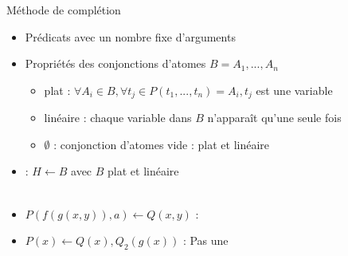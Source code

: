 \begin{frame}{Méthode de complétion}
  \begin{center}
  \end{center}
\end{frame}

\begin{frame}{\csclause}
  \begin{itemize}[<+->]
  \item Prédicats avec un nombre fixe d'arguments
  \item Propriétés des conjonctions d'atomes $B = A_1, ..., A_n$
    \begin{itemize}
    \item plat : $\forall A_i \in B, \forall t_j \in P(t_1, ..., t_n) = A_i, t_j$ est une variable
    \item linéaire : chaque variable dans $B$ n'apparaît qu'une seule fois
    \item $\emptyset$ : conjonction d'atomes vide : plat et linéaire
    \end{itemize}
    \vspace{\baselineskip}
  \item \csclause : $H \leftarrow B$ avec $B$ plat et linéaire \\~

  \item $P(f(g(x,y)),a) \leftarrow Q(x,y)$ : \csclause
  \item $P(x) \leftarrow Q(x),Q_2(g(x))$ : Pas une \csclause
  \end{itemize}
  
\end{frame}

